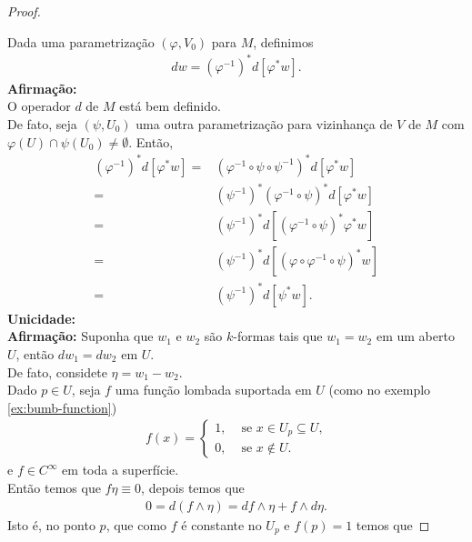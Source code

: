 \begin{proof} 
  \begin{center}
      
  \end{center}
  Dada uma parametrização $(\varphi, V_0)$ para $M$, definimos
  \begin{align*}
    dw=(\varphi^{-1})^{\ast}d\left[ \varphi^{\ast}w \right].
  \end{align*}
  \textbf{Afirmação:}\\
  O operador $d$ de $M$ está bem definido.\\
  De fato, seja $(\psi, U_0)$ uma outra parametrização para vizinhança de $V$ de $M$ com $\varphi(U)\cap\psi(U_0)\neq \emptyset$. Então,
  \begin{align*}
    (\varphi^{-1})^{\ast}d\left[ \varphi^{\ast}w \right]=&(\varphi^{-1}\circ\psi\circ\psi^{-1})^{\ast}d\left[ \varphi^{\ast}w \right]\\
    =&(\psi^{-1})^{\ast}(\varphi^{-1}\circ\psi)^{\ast}d\left[ \varphi^{\ast}w \right]\\
    =&(\psi^{-1})^{\ast}d\left[ (\varphi^{-1}\circ\psi)^{\ast}\varphi^{\ast}w \right]\\
    =&(\psi^{-1})^{\ast}d\left[ (\varphi\circ\varphi^{-1}\circ\psi)^{\ast}w \right]\\
    =&(\psi^{-1})^{\ast}d\left[ \psi^{\ast}w \right].
  \end{align*}
  \textbf{Unicidade:}\\
  \textbf{Afirmação:} Suponha que $w_1$ e $w_2$ são $k$-formas tais que $w_1=w_2$ em um aberto $U$, então $dw_1=dw_2$ em $U$.\\
  De fato, considete $\eta=w_1-w_2$.\\
  Dado $p\in U$, seja $f$ uma função lombada suportada em $U$ (como no exemplo \ref{ex:bumb-function}) 
  \begin{align*}
    f(x)=\begin{cases}
      1, &\text{ se } x\in U_p\subseteq U \text{,} \\
      0, &\text{ se } x\notin U.
    \end{cases}
  \end{align*}
  e $f\in C^{\infty}$ em toda a superfície.\\
  Então temos que $f\eta\equiv 0$, depois temos que
  \begin{align*}
    0=d(f\wedge\eta)=df\wedge\eta+f\wedge d\eta.
  \end{align*}
  Isto é, no ponto $p$, que como $f$ é constante no $U_p$ e $f(p)=1$ temos que 

\end{proof}
